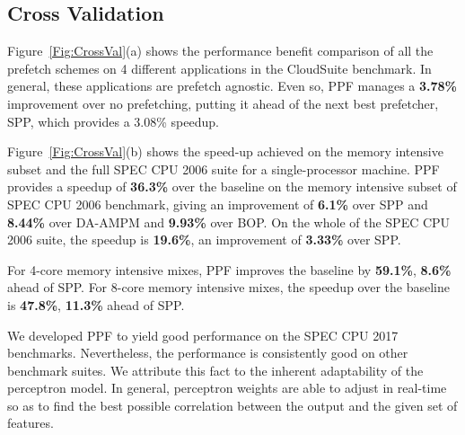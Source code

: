 \subsection{Cross Validation}
\label{Results-CrossVal}

%
%

Figure~\ref{Fig:CrossVal}(a) shows the performance benefit comparison
of all the prefetch schemes on 4 different applications in the
CloudSuite benchmark.  In general, these applications are prefetch
agnostic.  Even so, PPF manages a \textbf{3.78\%} improvement over no
prefetching, putting it ahead of the next best prefetcher, SPP, which
provides a 3.08\% speedup.

Figure~\ref{Fig:CrossVal}(b) shows the speed-up achieved on the memory
intensive subset and the full SPEC CPU 2006 suite for a
single-processor machine.  PPF provides a speedup of \textbf{36.3\%}
over the baseline on the memory intensive subset of SPEC CPU 2006
benchmark, giving an improvement of \textbf{6.1\%} over SPP and
\textbf{8.44\%} over DA-AMPM and \textbf{9.93\%} over BOP. On the whole
of the SPEC CPU 2006 suite, the speedup is \textbf{19.6\%}, an
improvement of \textbf{3.33\%} over SPP.

For 4-core memory intensive mixes, PPF improves the baseline by
\textbf{59.1\%}, \textbf{8.6\%} ahead of SPP. For 8-core memory
intensive mixes, the speedup over the baseline is \textbf{47.8\%},
\textbf{11.3\%} ahead of SPP.

We developed PPF to yield good performance on the SPEC CPU 2017
benchmarks.  Nevertheless, the performance is consistently good on
other benchmark suites.  We attribute this fact to the inherent
adaptability of the perceptron model.  In general, perceptron weights
are able to adjust in real-time so as to find the best possible
correlation between the output and the given set of features.
